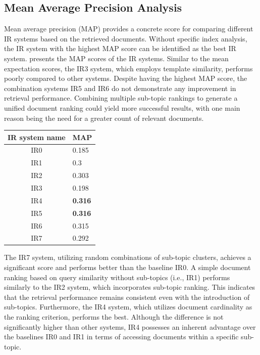 \subsection{Mean Average Precision Analysis}

Mean average precision (MAP) provides a concrete score for comparing different \ac{IR} systems based on the retrieved documents. Without specific index analysis, the \ac{IR} system with the highest MAP score can be identified as the best \ac{IR} system.  presents the \ac{MAP} scores of the \ac{IR} systems. Similar to the mean expectation scores, the IR3 system, which employs template similarity, performs poorly compared to other systems. Despite having the highest MAP score, the combination systems IR5 and IR6 do not demonstrate any improvement in retrieval performance. Combining multiple sub-topic rankings to generate a unified document ranking could yield more successful results, with one main reason being the need for a greater count of relevant documents.


\begin{center}
	\label{tab:map_results}
		\begin{tabularx}{0.4\textwidth}{|c|Y|}
		\hline
		IR system name & MAP \\
		\hline
		IR0 & 0.185 \\
		\hline
		IR1 &  0.3 \\
		\hline
		IR2 &  0.303 \\
		\hline
		IR3 &  0.198 \\
		\hline
		IR4 &   \textbf{0.316} \\
		\hline
		IR5 &    \textbf{0.316} \\
		\hline
		IR6 &   0.315\\
		\hline
		IR7 &  0.292 \\
		\hline
	\end{tabularx}
\end{center}


The IR7 system, utilizing random combinations of sub-topic clusters, achieves a significant score and performs better than the baseline IR0. A simple document ranking based on query similarity without sub-topics (i.e., IR1) performs similarly to the IR2 system, which incorporates sub-topic ranking. This indicates that the retrieval performance remains consistent even with the introduction of sub-topics. Furthermore, the IR4 system, which utilizes document cardinality as the ranking criterion, performs the best. Although the difference is not significantly higher than other systems, IR4 possesses an inherent advantage over the baselines IR0 and IR1 in terms of accessing documents within a specific sub-topic.

